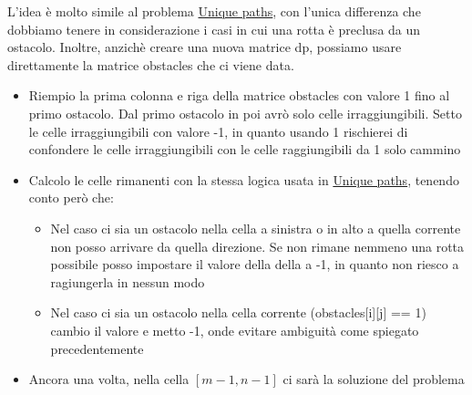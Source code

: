 L'idea è molto simile al problema \hyperref[uniquepaths]{Unique paths}, con l'unica differenza che dobbiamo tenere in considerazione i casi in cui una rotta è preclusa da un ostacolo. Inoltre, anzichè creare una nuova matrice {\ttfamily dp}, possiamo usare direttamente la matrice {\ttfamily obstacles} che ci viene data.
\begin{itemize}
	\item Riempio la prima colonna e riga della matrice {\ttfamily obstacles} con valore 1 fino al primo ostacolo. Dal primo ostacolo in poi avrò solo celle irraggiungibili. Setto le celle irraggiungibili con valore -1, in quanto usando 1 rischierei di confondere le celle irraggiungibili con le celle raggiungibili da 1 solo cammino
	\item Calcolo le celle rimanenti con la stessa logica usata in \hyperref[uniquepaths]{Unique paths}, tenendo conto però che:
	      \begin{itemize}
		      \item Nel caso ci sia un ostacolo nella cella a sinistra o in alto a quella corrente non posso arrivare da quella direzione. Se non rimane nemmeno una rotta possibile posso impostare il valore della della a -1, in quanto non riesco a ragiungerla in nessun modo
		      \item Nel caso ci sia un ostacolo nella cella corrente ({\ttfamily obstacles[i][j] == 1}) cambio il valore e metto -1, onde evitare ambiguità come spiegato precedentemente
	      \end{itemize}
	\item Ancora una volta, nella cella $ \left[m-1,n-1\right] $ ci sarà la soluzione del problema
\end{itemize}

